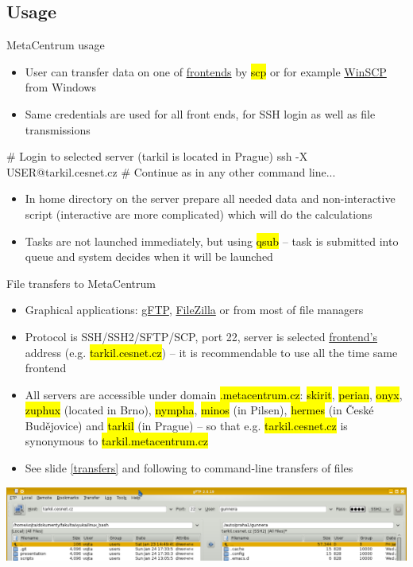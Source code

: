 \documentclass[compress, ucs, xelatex, 11pt, xcolor=svgnames,
  hyperref={
    bookmarks=true,
    unicode=true,
    colorlinks=true,
    pdftitle={Linux, command line and MetaCentrum},
    plainpages=false,
    pdfauthor={Vojtech Zeisek},
    pdfsubject={Course about use of Linux command line, writing shell scripts and using MetaCentrum of CESNET},
    pdfcreator={XeLaTeX},
    pdfkeywords={Linux, GNU, BASH, shell, command line, MetaCentrum},
    linkcolor=DarkRed,
    anchorcolor=DarkBlue,
    citecolor=Indigo,
    filecolor=NavyBlue,
    menucolor=DarkMagenta,
    urlcolor=DarkBlue,
    pdftex},
  url={hyphens, lowtilde} %
  ]{beamer}
\renewcommand{\texttt}[1]{\hl{\ttfamily #1}}
\begin{document}
\subsection{Usage}

\begin{frame}[fragile]{MetaCentrum usage}
  \begin{itemize}
    \item User can transfer data on one of \href{https://wiki.metacentrum.cz/wiki/Frontend}{frontends} by \texttt{scp} or for example \href{https://winscp.net/}{WinSCP} from Windows
    \item Same credentials are used for all front ends, for SSH login as well as file transmissions
  \end{itemize}
  \begin{bashcode}
    # Login to selected server (tarkil is located in Prague)
    ssh -X USER@tarkil.cesnet.cz
    # Continue as in any other command line...
  \end{bashcode}
  \begin{itemize}
    \item In home directory on the server prepare all needed data and non-interactive script (interactive are more complicated) which will do the calculations
    \item Tasks are not launched immediately, but using \texttt{qsub} -- task is submitted into queue and system decides when it will be launched
  \end{itemize}
\end{frame}

\begin{frame}{File transfers to MetaCentrum}
  \begin{itemize}
    \item Graphical applications: \href{http://gftp.org/}{gFTP}, \href{https://filezilla-project.org/}{FileZilla} or from most of file managers
    \item Protocol is SSH/SSH2/SFTP/SCP, port 22, server is selected \href{https://wiki.metacentrum.cz/wiki/Frontend}{frontend's} address (e.g. \texttt{tarkil.cesnet.cz}) -- it is recommendable to use all the time same frontend
    \item All servers are accessible under domain \texttt{*.metacentrum.cz}: \texttt{skirit}, \texttt{perian}, \texttt{onyx}, \texttt{zuphux} (located in Brno), \texttt{nympha}, \texttt{minos} (in Pilsen), \texttt{hermes} (in České Budějovice) and \texttt{tarkil} (in Prague) -- so that e.g. \texttt{tarkil.cesnet.cz} is synonymous to \texttt{tarkil.metacentrum.cz}
    \item See slide \ref{transfers} and following to command-line transfers of files
  \end{itemize}
  \includegraphics[width=\textwidth]{gftp.png}
\end{frame}
\end{document}
